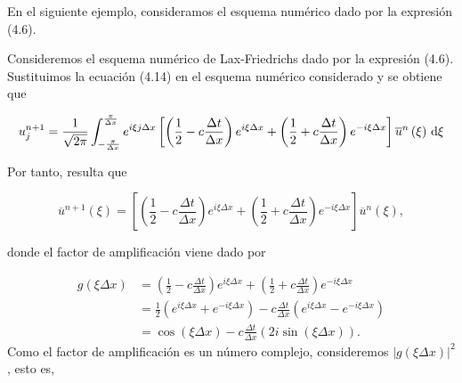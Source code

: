 En el siguiente ejemplo, consideramos el esquema numérico dado por la expresión (4.6).

\begin{example}
  Consideremos el esquema numérico de Lax-Friedrichs dado por la
  expresión (4.6).
  Sustituimos la ecuación (4.14) en el esquema numérico considerado y
  se obtiene que

  \begin{equation*}
    u^{n+1}_{j}=
    \frac{1}{\sqrt{2\pi}}
    \int_{-\frac{\pi}{\Delta x}}^{\frac{\pi}{\Delta x}}
    e^{i\xi j\Delta x}
    \left[
      \left(
      \frac{1}{2}-
      c\frac{\Delta t}{\Delta x}
      \right)
      e^{i\xi\Delta x}+
      \left(
      \frac{1}{2}+
      c\frac{\Delta t}{\Delta x}
      \right)
      e^{-i\xi\Delta x}
      \right]
    \overline{u}^{n}
    \left(\xi\right)
    \dl\xi
  \end{equation*}

  Por tanto, resulta que

  \begin{equation*}
    \overline{u}^{n+1}
    \left(\xi\right)=
    \left[
      \left(
      \frac{1}{2}-
      c\frac{\Delta t}{\Delta x}
      \right)
      e^{i\xi\Delta x}+
      \left(
      \frac{1}{2}+
      c\frac{\Delta t}{\Delta x}
      \right)
      e^{-i\xi\Delta x}
      \right]
    \overline{u}^{n}
    \left(\xi\right),
  \end{equation*}

  donde el factor de amplificación viene dado por

  \begin{align*}
    g
    \left(
    \xi\Delta x
    \right) & =
    \left(
    \frac{1}{2}-
    c\frac{\Delta t}{\Delta x}
    \right)
    e^{i \xi \Delta x}+
    \left(
    \frac{1}{2}+c \frac{\Delta t}{\Delta x}
    \right)
    e^{-i\xi\Delta x} \\
            & =
    \frac{1}{2}
    \left(
    e^{i\xi\Delta x}+
    e^{-i\xi\Delta x}
    \right)-
    c\frac{\Delta t}{\Delta x}
    \left(e^{i\xi\Delta x}-
    e^{-i\xi\Delta x}
    \right)           \\
            & =
    \cos\left(\xi\Delta x\right)-
    c\frac{\Delta t}{\Delta x}
    \left(
    2i\sin
    \left(\xi \Delta x\right)
    \right).
  \end{align*}
  Como el factor de amplificación es un número complejo, consideremos
  \begin{math}
    {\left|g\left(\xi\Delta x\right)\right|}^{2}
  \end{math},
  esto es,


\end{example}
